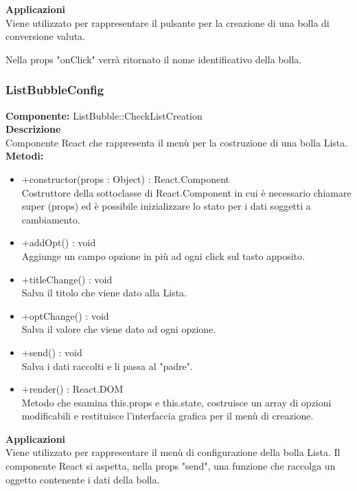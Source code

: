 \textbf{Applicazioni}\\
Viene utilizzato per rappresentare il pulsante per la creazione di una bolla di conversione valuta.

Nella props "onClick" verrà ritornato il nome identificativo della bolla. 


\clearpage

\subsubsection{ListBubbleConfig}
\textbf{Componente:}  ListBubble::CheckListCreation\\
\textbf{Descrizione}\\
Componente React che rappresenta il menù per la costruzione di una bolla Lista.
\\
\textbf{Metodi:} 
\begin{itemize}
\item +constructor(props : Object) : React.Component 
\\
Costruttore della sottoclasse di React.Component in cui è necessario chiamare super (props) ed è possibile inizializzare lo stato per i dati soggetti a cambiamento.

\item +addOpt() : void 
\\
Aggiunge un campo opzione in più ad ogni click sul tasto apposito.

\item +titleChange() : void 
\\
Salva il titolo che viene dato alla Lista.

\item +optChange() : void 
\\
Salva il valore che viene dato ad ogni opzione.

\item +send() : void 
\\
Salva i dati raccolti e li passa al "padre".

\item +render() : React.DOM
\\
Metodo che esamina this.props e this.state, costruisce un array di opzioni modificabili e restituisce l'interfaccia grafica per il menù di creazione.
\end{itemize} 


\textbf{Applicazioni}\\
Viene utilizzato per rappresentare il menù di configurazione della bolla Lista. Il componente React si aspetta, nella props "send", una funzione che raccolga un oggetto contenente i dati della bolla. 


